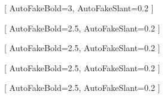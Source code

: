 \geometry{
    a4paper,
    left=22mm,
    right=22mm,
    top=28mm,
    bottom=28mm,
    headheight=14pt,
    headsep=8mm,
    footskip=12mm
}

\setmainfont{Times New Roman}

[
    AutoFakeBold={3},
    AutoFakeSlant={0.2}
]

[
    AutoFakeBold={2.5},
    AutoFakeSlant={0.2}
]

[
    AutoFakeBold={2.5},
    AutoFakeSlant={0.2}
]

[
    AutoFakeBold={2.5},
    AutoFakeSlant={0.2}
]
\newcommand{\theoremFont}{\CJKfamily{theoremCJK}}

[
    AutoFakeBold={2.5},
    AutoFakeSlant={0.2}
]
\newcommand{\proofFont}{\CJKfamily{proofCJK}}

